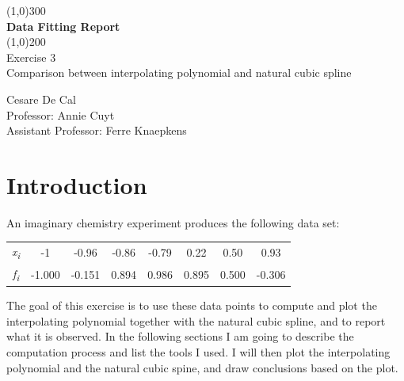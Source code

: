 \documentclass{article}
\begin{document}
\begin{titlepage}
	\begin{center}
	\line(1,0){300}\\
	[0.25in]
	\huge{\bfseries Data Fitting Report}  \\
	[2mm]
	\line(1,0){200} \\
	[1.5cm]
	\Large{Exercise 3} \\
	[0.25cm]
	\Large{Comparison between interpolating polynomial and natural cubic spline} \\
	[12cm]
	\end{center}
	\begin{flushright}
	\large{Cesare De Cal \\
	[0.25cm]
	Professor: Annie Cuyt \\
	[0.25cm]
	Assistant Professor: Ferre Knaepkens \\
	}
	\end{flushright}
\end{titlepage}

\section{Introduction}\label{sec:intro}
An imaginary chemistry experiment produces the following data set:

  \begin{table}[!ht]
    \large        %
    \centering    %
    \begin{tabular}{|c|c|c|c|c|c|c|c|}
    \hline
    \it{x}\textsubscript{i}&-1&-0.96&-0.86&-0.79&0.22&0.50&0.93\\     %
    \it{f}\textsubscript{i}&-1.000&-0.151&0.894&0.986&0.895&0.500&-0.306\\
    \hline        %
    \end{tabular}
  \end{table}

The goal of this exercise is to use these data points to compute and plot the interpolating polynomial together with the natural cubic spline, and to report what it is observed. In the following sections I am going to describe the computation process and list the tools I used. I will then plot the interpolating polynomial and the natural cubic spine, and draw conclusions based on the plot.
\end{document}
